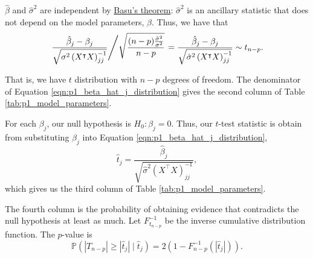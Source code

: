 \documentclass[letterpaper,11pt]{article}
\begin{document}
\begin{enumerate}
\begin{enumerate}
\begin{description}
      $\hat{\beta}$ and $\hat{\sigma}^2$ are independent by
      \href{https://en.wikipedia.org/wiki/Basu\%27s_theorem}{Basu's theorem}:
      $\hat{\sigma}^2$ is an ancillary statistic that does not depend on the
      model parameters, $\beta$. Thus, we have that
      \begin{equation}
        \left.
          \frac{\hat{\beta}_j - \beta_j}{\sqrt{\sigma^2\left(X^\intercal X\right)^{-1}_{jj}}}
          \middle/
          \sqrt{\frac{(n - p)\frac{\hat{\sigma}^2}{\sigma^2}}{n-p}}
        \right. 
        = \frac{\hat{\beta}_j - \beta_j}{\sqrt{\hat{\sigma}^2\left(X^\intercal X\right)^{-1}_{jj}}}
        \sim t_{n-p}.
        \label{eqn:p1_beta_hat_j_distribution}
      \end{equation}

      That is, we have $t$ distribution with $n - p$ degrees of freedom. The
      denominator of Equation \ref{eqn:p1_beta_hat_j_distribution} gives the
      second column of Table \ref{tab:p1_model_parameters}.

      For each $\beta_j$, our null hypothesis is $H_0: \beta_j = 0$. Thus, our
      $t$-test statistic is obtain from substituting $\beta_j$ into Equation
      \ref{eqn:p1_beta_hat_j_distribution},
      \begin{equation*}
        \hat{t}_j = \frac{\hat{\beta}_j}{\sqrt{\hat{\sigma}^2\left(X^\intercal X\right)^{-1}_{jj}}},
      \end{equation*}
      which gives us the third column of Table \ref{tab:p1_model_parameters}.

      The fourth column is the probability of obtaining evidence that
      contradicts the null hypothesis at least as much. Let $F^{-1}_{t_{n-p}}$
      be the inverse cumulative distribution function. The $p$-value is
      \begin{equation*}
        \mathbb{P}\left(
          \left\lvert T_{n - p}\right\rvert \geq
          \left\lvert \hat{t}_j\right\rvert
          \mid
          \hat{t}_j
        \right) = 
        2\left(1 - F^{-1}_{n - p}\left(\left\lvert\hat{t}_j\right\rvert\right)\right).
      \end{equation*}
    \end{description}
  \end{enumerate}
\end{enumerate}
\end{document}
